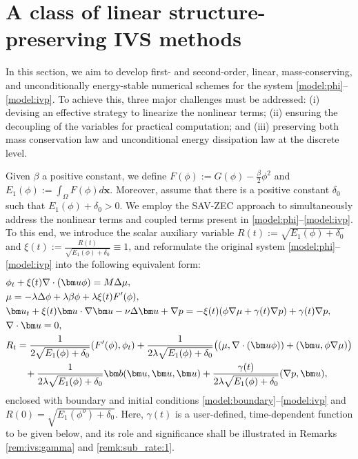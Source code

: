 \section{A class of linear structure-preserving IVS methods} \label{sec:scheme}
In this section, we aim to develop first- and second-order, linear, mass-conserving, and unconditionally energy-stable numerical schemes for the system \eqref{model:phi}--\eqref{model:ivp}. To achieve this, three major challenges must be addressed:
(i) devising an effective strategy to linearize the nonlinear terms;
(ii) ensuring the decoupling of the variables for practical computation; 
and (iii) preserving both mass conservation law and unconditional energy dissipation law at the discrete level.

Given $\beta$ a positive constant, we define $F(\phi) := G(\phi)-\frac{\beta}{2}\phi^2$ and $E_1(\phi):=\int_{\Omega} F(\phi) d \bm x$. 
Moreover, assume that there is a positive constant $\delta_0$ such that $E_1(\phi)+\delta_0>0$. We employ the SAV-ZEC approach \cite{zgdsisc2024} to simultaneously address the nonlinear terms and  coupled terms present in \eqref{model:phi}--\eqref{model:ivp}. To this end, we introduce the scalar auxiliary variable 
$  R(t):= \sqrt{E_1(\phi)+\delta_0}$ and $ \xi(t):=\frac{R(t)}{\sqrt{E_1(\phi)+\delta_0}}\equiv 1$,
and reformulate the original system \eqref{model:phi}--\eqref{model:ivp} into the following equivalent form:
\begin{align}
	& \phi_t+ \xi(t) \nabla \cdot (\bm u \phi) =M \Delta \mu,  \label{model:sav:phi} \\
	& \mu=- \lambda\Delta \phi +\lambda  \beta \phi+ \lambda \xi(t) F^{\prime}(\phi),  \label{model:sav:mu}\\
	& \bm u_t +  \xi(t) \bm u\cdot\nabla \bm u-\nu \Delta \bm u +\nabla p=-  \xi(t) (\phi \nabla \mu + \gamma(t) \nabla p) + \gamma(t)  \nabla p,  \label{model:sav:u}\\
	& \nabla \cdot \bm u = 0,    \label{model:sav:divu} \\
	&  R_t =\frac{1}{2  \sqrt{E_1(\phi)+\delta_0}}   ( F^{\prime}(\phi), \phi_t)
	+  \frac{1}{2 \lambda  \sqrt{E_1(\phi)+\delta_0}} \big((\mu , \nabla \cdot (\bm u \phi) )+  ( {\bm u} ,  \phi  \nabla\mu ) \big) \notag\\
	&\qquad  + \frac{1}{2 \lambda  \sqrt{E_1(\phi)+\delta_0}} \bm b(\bm u, \bm u, \bm u) + \frac{ \gamma(t)}{2 \lambda  \sqrt{E_1(\phi)+\delta_0}}  (\nabla p, \bm u), 
	\label{model:sav:r}
\end{align}
enclosed with boundary and initial conditions \eqref{model:boundary}--\eqref{model:ivp} and $R(0)=\sqrt{E_1(\phi^o)+\delta_0}$.
Here, $\gamma(t)$ is a user-defined, time-dependent function to be given below, and its role and significance shall be illustrated in Remarks \ref{rem:ivs:gamma} and \ref{remk:sub_rate:1}. 

